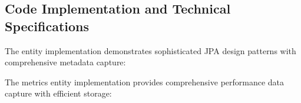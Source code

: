 \subsection{Code Implementation and Technical Specifications}

The entity implementation demonstrates sophisticated JPA design patterns with comprehensive metadata capture:



The metrics entity implementation provides comprehensive performance data capture with efficient storage:


